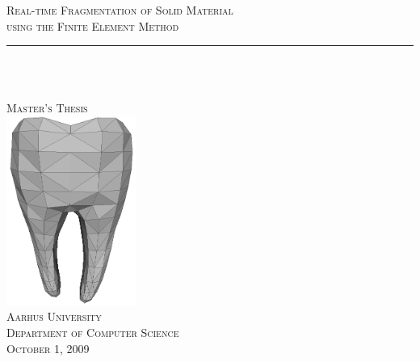 
 
\newcommand{\HRule}{\rule{\linewidth}{0.5mm}}

%
\begin{titlingpage} 
\begin{center}

\textsc{\huge 
  Real-time Fragmentation of Solid Material \\
  \vspace{2mm}
  using the Finite Element Method}\\[0.5cm] 

\begin{minipage}{0.9\textwidth}
\HRule \\
\end{minipage}\\%
\textsc{\LARGE Master's Thesis}\\[1.5cm]


\includegraphics[width=0.32\textwidth]{./images/titlepage_highres.png}\\[0.5cm]


\textsc{\huge Aarhus University}\\[0.1cm]
\textsc{\Large Department of Computer Science}\\[0.1cm]
\textsc{\Large October 1, 2009}\\[1.0cm]



\end{center}
\end{titlingpage}
